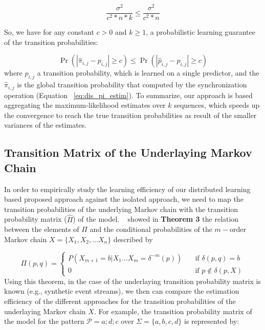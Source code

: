 \[ 
\frac{\sigma^{2}}{c^2 *n*k} \leq
\frac{\sigma^{2}}{c^2 * n}
 \]

So, we have for any constant $c > 0$ and $k \ge 1$, a probabilistic learning guarantee of the transition probabilities: 

\[ \Pr\left( |\hat{\pi}_{i,j} - {p}_{i,j}| \geq c \right) \leq
 \Pr\left( |\hat{p}_{i,j} - {p}_{i,j}| \geq c \right)
 \]
 where $\hat{p}_{i,j}$ a transition probability, which is learned on a single \pmcmr predictor, and the $\hat{\pi}_{i,j}$ is the global transition probability that computed by the synchronization operation (Equation ~\ref{eq:dis_pi_estim}). To summarize, our approach is based aggregating the maximum-likelihood estimates over $k$ sequences, which speeds up the convergence to reach the true transition probabilities as result of the smaller variances of the estimates.


 
\subsection{Transition Matrix of the Underlaying Markov Chain}

\par In order to empirically study the learning efficiency of our distributed learning based proposed approach against the isolated approach, we need to map the transition probabilities of the underlying Markov chain with the transition probability matrix ($\hat{\Pi}$) of the \pmcmr model. ~\citet{nuel_pattern_2008} showed in \textbf{Theorem 3} the relation between the elements  of 
$\Pi$ and the conditional probabilities of the $m-$order Markov chain $X=\{X_1, X_2, \ldots X_n\}$ described by 

\[ \Pi(p, q) =
\begin{cases}
P(X_{m+1}=b|X_1\ldots X_m=\delta^{-m}(p))     & \quad \text{if } \delta(p,q)=b \\
0  & \quad \text{if } p \notin  \delta(p,X)
\end{cases}
\]
Using this theorem, in the case of the underlaying transition probability matrix is known (e.g., synthetic event streams),  we then can compare the estimation efficiency of the different approaches for the transition probabilities of the underlaying Markov chain $X$.  For example, the transition probability matrix of the \pmcmr model for the pattern $\mathcal{P}=a ; d ; c$ over  $\Sigma=\{a,b,c,d\}$ is represented by: 

